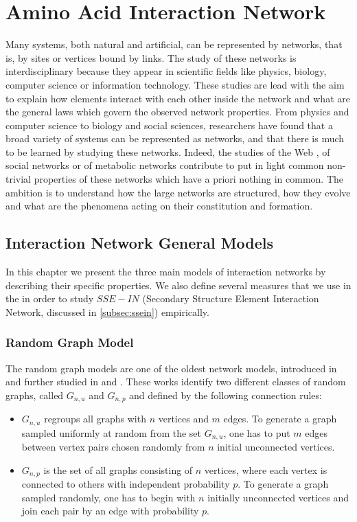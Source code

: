\chapter {Amino Acid Interaction Network}
\label{interaction_network}
Many systems, both natural and artificial, can be represented by networks, that is, by sites or vertices bound by links. The study of these networks is interdisciplinary because they appear in scientific fields like physics, biology, computer science or information technology.
These studies are lead with the aim to explain how elements interact with each other inside the network and what are the general laws which govern the observed network properties. From physics and computer science to biology and social sciences, researchers have found that a broad variety of systems can be represented as networks, and that there is much to be learned by studying these networks. Indeed, the studies of the Web \cite{broder2000graph}, of social networks \cite{wasserman1994social} or of metabolic networks \cite{jeong2000large} contribute to put in light common non-trivial properties of these networks which have a priori nothing in common. The ambition is to understand how the large networks are structured, how they evolve and what are the phenomena acting on their constitution and formation.
\section {Interaction Network General Models} 
In this chapter we present the three main models of interaction networks by describing their specific properties. We also define several measures that we use in the in order to study $SSE-IN$ (Secondary Structure Element Interaction Network, discussed in \ref{subsec:ssein}) empirically.
\subsection {Random Graph Model}
The random graph models are one of the oldest network models, introduced in \cite{solomonoff1951connectivity} and further studied in \cite{erdds1959random} and \cite{erd6s1960evolution}. These works identify two different classes of random graphs, called $G_{n,u}$ and $G_{n,p}$ and
defined by the following connection rules:
\begin{itemize}
\item $G_{n,u}$ regroups all graphs with $n$ vertices and $m$ edges. To generate a graph sampled uniformly at random from the set $G_{n,u}$, one has to put $m$ edges between vertex pairs chosen randomly from $n$ initial unconnected vertices.
\item $G_{n,p}$ is the set of all graphs consisting of $n$ vertices, where each vertex is connected to others with independent probability $p$. To generate a graph sampled randomly, one has to begin with $n$ initially unconnected vertices and join each pair by an edge with probability $p$.
\end{itemize}

